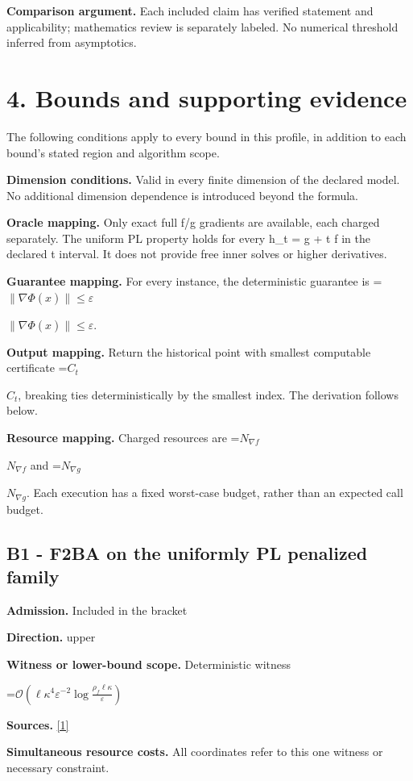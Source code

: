 \documentclass[10pt,a4paper]{article}
\newcommand{\AtlasMath}[1]{\par\begingroup\centering\setbox0=\hbox{$\displaystyle #1$}\ifdim\wd0>1.4\linewidth\typeout{ATLAS WIDE FORMULA: \the\wd0}\fi\ifdim\wd0>\linewidth\resizebox{\linewidth}{!}{\box0}\else\box0\fi\par\endgroup}
\newcommand{\AtlasInlineMath}[1]{\begingroup\setbox0=\hbox{$#1$}\ifdim\wd0>.4\linewidth\endgroup\AtlasMath{#1}\else\endgroup$#1$\fi}
\begin{document}
\textbf{Comparison argument.} Each included claim has verified statement and applicability; mathematics review is separately labeled. No numerical threshold inferred from asymptotics.

\section{4. Bounds and supporting evidence}
The following conditions apply to every bound in this profile, in addition to each bound's stated region and algorithm scope.

\textbf{Dimension conditions.} Valid in every finite dimension of the declared model. No additional dimension dependence is introduced beyond the formula.

\textbf{Oracle mapping.} Only exact full f/g gradients are available, each charged separately. The uniform PL property holds for every h\_t = g + t f in the declared t interval. It does not provide free inner solves or higher derivatives.

\textbf{Guarantee mapping.} For every instance, the deterministic guarantee is \AtlasInlineMath{\|\nabla\Phi(\widehat x)\|\le\varepsilon}.

\textbf{Output mapping.} Return the historical point with smallest computable certificate \AtlasInlineMath{C_t}, breaking ties deterministically by the smallest index. The derivation follows below.

\textbf{Resource mapping.} Charged resources are \AtlasInlineMath{N_{\nabla f}} and \AtlasInlineMath{N_{\nabla g}}. Each execution has a fixed worst-case budget, rather than an expected call budget.

\subsection{B1 - F2BA on the uniformly PL penalized family}
\textbf{Admission.} Included in the bracket

\textbf{Direction.} upper

\textbf{Witness or lower-bound scope.} Deterministic witness

\AtlasMath{\mathcal{O}\!\left(\ell\kappa^4\varepsilon^{-2}\log\frac{\rho_f\ell\kappa}{\varepsilon}\right)}
\textbf{Sources.} \href{https://proceedings.mlr.press/v247/chen24a/chen24a.pdf}{[1]}

\textbf{Simultaneous resource costs.} All coordinates refer to this one witness or necessary constraint.
\end{document}
